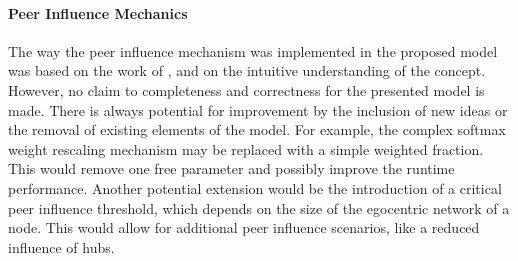 \paragraph{Peer Influence Mechanics}
The way the peer influence mechanism was implemented in the proposed model was based on the work of \citet{Walk2016}, and on the intuitive understanding of the concept.
However, no claim to completeness and correctness for the presented model is made.
There is always potential for improvement by the inclusion of new ideas or the removal of existing elements of the model.
For example, the complex softmax weight rescaling mechanism may be replaced with a simple weighted fraction.
This would remove one free parameter and possibly improve the runtime performance.
Another potential extension would be the introduction of a critical peer influence threshold, which depends on the size of the egocentric network of a node.
This would allow for additional peer influence scenarios, like a reduced influence of hubs.
